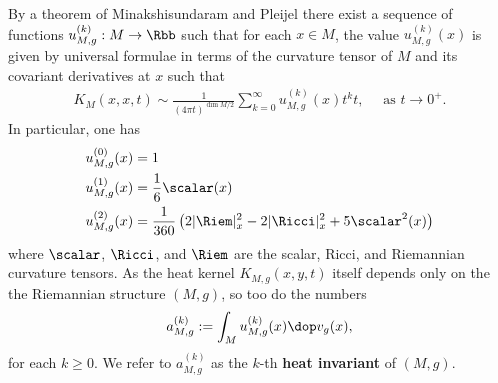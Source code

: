 By a theorem of Minakshisundaram and Pleijel \cite{Minakshisundaram.Pleijel-[PropertiesEigenfunctionsLaplaceoperator]1949} there exist a sequence of functions $u_{M,g}^{(k)} : M \to \Rbb$ such that for each $x \in M$, the value $u_{M,g}^{(k)}(x)$ is given by universal formulae in terms of the curvature tensor of $M$ and its covariant derivatives at $x$ such that
\begin{align}\label{eq:heatAsymptoticM}
  K_M(x,x,t) \sim \frac{1}{(4\pi t)^{\dim M /2 }} \sum_{k=0}^\infty u_{M,g}^{(k)}(x)t^k t, \quad \text{ as $t\to 0^+$.}
\end{align}
In particular, \cite[page 398]{Berger-[PanoramicViewRiemannian]2003} one has
\begin{align}
  u_{M,g}^{(0)} (x) & = 1                            \label{eq:heatzero}                                             \\
  u_{M,g}^{(1)}(x)  & = \frac{1}{6} \label{eq:heatone}\scalar(x)                                                     \\
  u_{M,g}^{(2)}(x)  & = \frac{1}{360} \left( 2|\Riem|^2_x -2 |\Ricci|^2_x +5 \scalar^2(x) \right) \label{eq:heattwo}
\end{align}
where $\scalar$, $\Ricci$, and $\Riem$ are the scalar, Ricci, and Riemannian curvature tensors. As the heat kernel $K_{M,g}(x,y,t)$ itself depends only on the the Riemannian structure $(M,g)$, so too do the numbers
\begin{align}
  a_{M,g}^{(k)} := \int_M u_{M,g}^{(k)}(x) \dop v_g(x),
\end{align}
for each $k\geq 0$. We refer to $a_{M,g}^{(k)}$ as the $k$-th \textbf{heat invariant} of $(M,g)$.

